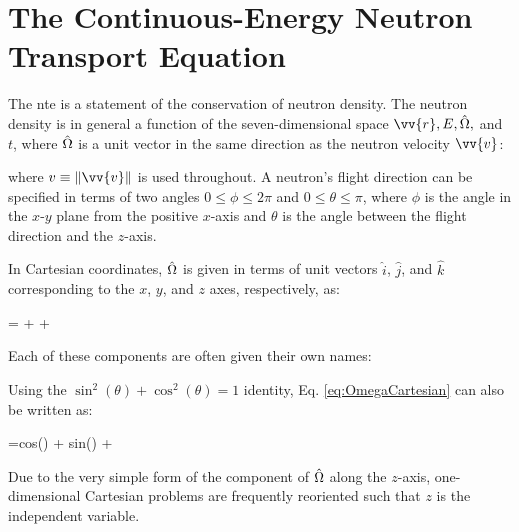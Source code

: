 \section{The Continuous-Energy Neutron Transport Equation}
\label{sec:CE_NTE}

The \gls{nte} is a statement of the conservation of neutron density. The neutron density is in general a function of the seven-dimensional space \(\vv{r}, E, \hO,\) and \(t\), where \(\hat{\Omega}\) is a unit vector in the same direction as the neutron velocity \(\vv{v}\):

\beq
\label{eq:OmegaDef}
\hO\equiv {}
\eeq

where \(v\equiv\|\vv{v}\|\) is used throughout. A neutron's flight direction can be specified in terms of two angles \(0\leq\phi\leq2\pi\) and \(0\leq\theta\leq\pi\), where \(\phi\) is the angle in the \(x\)-\(y\) plane from the positive \(x\)-axis and \(\theta\) is the angle between the flight direction and the \(z\)-axis. 

\begin{tcolorbox}[breakable]
In Cartesian coordinates, \(\hat{\Omega}\) is given in terms of unit vectors \(\hat{i}\), \(\hat{j}\), and \(\hat{k}\) corresponding to the \(x\), \(y\), and \(z\) axes, respectively, as:

\beqa
\label{eq:OmegaCartesian}
\hO  = \sin{(\theta)}\cos{(\phi)} + \sin{(\theta)}\sin{(\phi)} + \cos{(\theta)}\\
\eeqa

Each of these components are often given their own names: 

\beq
\label{eq:xiDef}
 \xi \equiv \sin{(\theta)}\cos{(\phi)}
\eeq

\beq
\label{eq:etaDef}
 \eta \equiv \sin{(\theta)}\sin{(\phi)}
\eeq

\beq
\label{eq:muDef}
 \mu \equiv \cos{(\theta)}
 \eeq
 
 Using the \(\sin^2{(\theta)} + \cos^2{(\theta)} = 1\) identity, Eq. \eqref{eq:OmegaCartesian} can also be written as:
 
\beq
\hO=\textrm{cos}(\phi) + \textrm{sin}(\phi) + \mu{}\\
\eeq
 
Due to the very simple form of the component of \(\hat{\Omega}\) along the \(z\)-axis, one-dimensional Cartesian problems are frequently reoriented such that \(z\) is the independent variable.
 
\end{tcolorbox}



